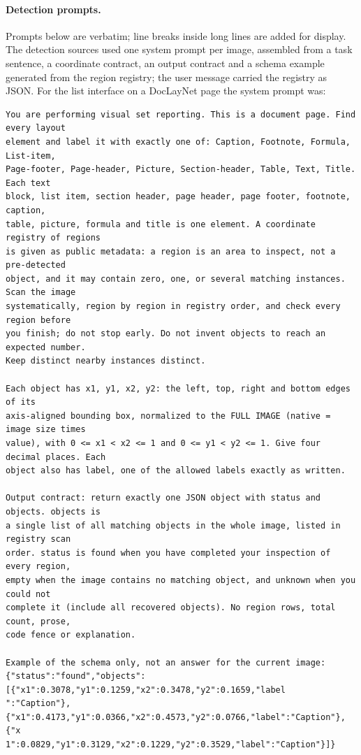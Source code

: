 \paragraph{Detection prompts.} Prompts below are verbatim; line breaks inside long lines are added for display. The detection sources used one system prompt per image, assembled from a task sentence, a coordinate contract, an output contract and a schema example generated from the region registry; the user message carried the registry as JSON. For the list interface on a DocLayNet page the system prompt was:

{\footnotesize
\begin{verbatim}
You are performing visual set reporting. This is a document page. Find every layout
element and label it with exactly one of: Caption, Footnote, Formula, List-item,
Page-footer, Page-header, Picture, Section-header, Table, Text, Title. Each text
block, list item, section header, page header, page footer, footnote, caption,
table, picture, formula and title is one element. A coordinate registry of regions
is given as public metadata: a region is an area to inspect, not a pre-detected
object, and it may contain zero, one, or several matching instances. Scan the image
systematically, region by region in registry order, and check every region before
you finish; do not stop early. Do not invent objects to reach an expected number.
Keep distinct nearby instances distinct.

Each object has x1, y1, x2, y2: the left, top, right and bottom edges of its
axis-aligned bounding box, normalized to the FULL IMAGE (native = image size times
value), with 0 <= x1 < x2 <= 1 and 0 <= y1 < y2 <= 1. Give four decimal places. Each
object also has label, one of the allowed labels exactly as written.

Output contract: return exactly one JSON object with status and objects. objects is
a single list of all matching objects in the whole image, listed in registry scan
order. status is found when you have completed your inspection of every region,
empty when the image contains no matching object, and unknown when you could not
complete it (include all recovered objects). No region rows, total count, prose,
code fence or explanation.

Example of the schema only, not an answer for the current image:
{"status":"found","objects":[{"x1":0.3078,"y1":0.1259,"x2":0.3478,"y2":0.1659,"label
":"Caption"},{"x1":0.4173,"y1":0.0366,"x2":0.4573,"y2":0.0766,"label":"Caption"},{"x
1":0.0829,"y1":0.3129,"x2":0.1229,"y2":0.3529,"label":"Caption"}]}
\end{verbatim}
}

